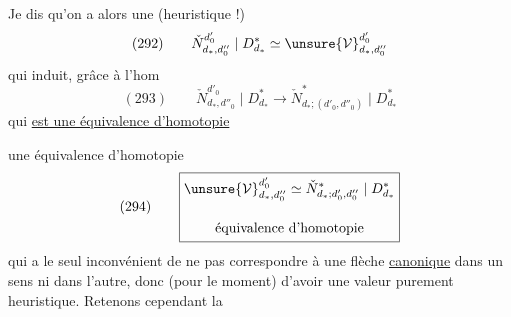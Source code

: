 Je dis qu'on a alors une  (heuristique !)
\[
(292)\qquad\check N^{d'_0}_{d_*,d''_0}\mid D^*_{d_*}\simeq\unsure{\mathcal V}^{d'_0}_{d_*,d''_0}
\]
qui induit, grâce à l'hom
\[
(293)\qquad\check N^{d'_0}_{d_*,d''_0}\mid D^*_{d_*}\longrightarrow\check N^*_{d_*;(d'_0,d''_0)}\mid D^*_{d_*}
\]
qui \uline{est une équivalence d'homotopie}

une équivalence d'homotopie
\[
(294)\qquad\boxed{\begin{gathered}
\unsure{\mathcal V}^{d'_0}_{d_*,d''_0}\simeq\check N^*_{d_*;d'_0,d''_0}\mid D^*_{d_*}\\[1em]
\text{équivalence d'homotopie}
\end{gathered}}
\]
qui a le seul inconvénient de ne pas correspondre à une flèche \uline{canonique} dans un sens ni dans l'autre, donc (pour le moment) d'avoir une valeur purement heuristique. Retenons cependant la
